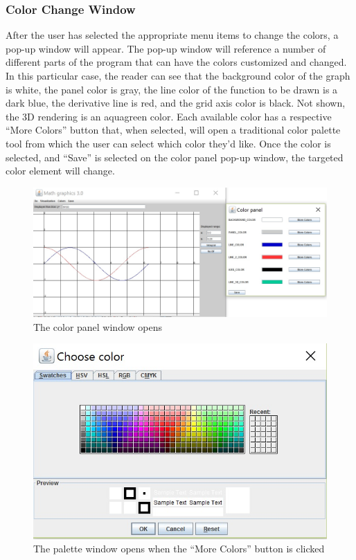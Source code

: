 \documentclass{article}[12 pt]
\begin{document}
		\subsubsection{Color Change Window}
		After the user has selected the appropriate menu items to change the colors, a pop-up window will appear. The pop-up window will reference a number of different parts of the program that can have the colors customized and changed. In this particular case, the reader can see that the background color of the graph is white, the panel color is gray, the line color of the function to be drawn is a dark blue, the derivative line is red, and the grid axis color is black. Not shown, the 3D rendering is an aquagreen color. Each available color has a respective ``More Colors'' button that, when selected, will open a traditional color palette tool from which the user can select which color they'd like. Once the color is selected, and ``Save'' is selected on the color panel pop-up window, the targeted color element will change. 
		\begin{figure}[h!]
		\centering
		\includegraphics[scale =.70]{ColorPanel}
		\caption{The color panel window opens}
		\end{figure}
				 
		 \begin{figure}[h!]
		 \centering
		 \includegraphics[scale=.70]{colorChooser}
		 \caption{The palette window opens when the ``More Colors'' button is clicked}
		 \end{figure}
		
\end{document}
